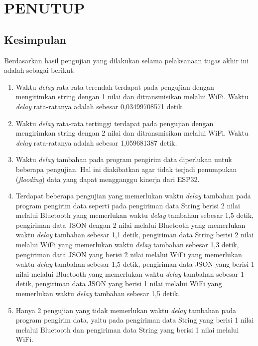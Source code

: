 \chapter{PENUTUP}
\label{chap:penutup}


\section{Kesimpulan}
\label{sec:kesimpulan}

Berdasarkan hasil pengujian yang dilakukan selama pelaksanaan tugas akhir ini adalah sebagai berikut:

\begin{enumerate}[nolistsep]

  \item Waktu \emph{delay} rata-rata terendah terdapat pada pengujian dengan mengirimkan string dengan 1 nilai dan ditransmisikan melalui WiFi. Waktu \emph{delay} rata-ratanya adalah sebesar 0,03499708571 detik.

  \item Waktu \emph{delay} rata-rata tertinggi terdapat pada pengujian dengan mengirimkan string dengan 2 nilai dan ditransmisikan melalui WiFi. Waktu \emph{delay} rata-ratanya adalah sebesar 1,059681387 detik.
  
  \item Waktu \emph{delay} tambahan pada program pengirim data diperlukan untuk beberapa pengujian. Hal ini diakibatkan agar tidak terjadi penumpukan (\emph{flooding}) data yang dapat mengganggu kinerja dari ESP32.

  \item Terdapat beberapa pengujian yang memerlukan waktu \emph{delay} tambahan pada program pengirim data seperti pada pengiriman data String berisi 2 nilai melalui Bluetooth yang memerlukan waktu \emph{delay} tambahan sebesar 1,5 detik, pengiriman data JSON dengan 2 nilai melalui Bluetooth yang memerlukan waktu \emph{delay} tambahan sebesar 1,1 detik, pengiriman data String berisi 2 nilai melalui WiFi yang memerlukan waktu \emph{delay} tambahan sebesar 1,3 detik, pengiriman data JSON yang berisi 2 nilai melalui WiFi yang memerlukan waktu \emph{delay} tambahan sebesar 1,5 detik, pengiriman data JSON yang berisi 1 nilai melalui Bluetooth yang memerlukan waktu \emph{delay} tambahan sebesar 1 detik, pengiriman data JSON yang berisi 1 nilai melalui WiFi yang memerlukan waktu \emph{delay} tambahan sebesar 1,5 detik.
  
  \item Hanya 2 pengujian yang tidak memerlukan waktu \emph{delay} tambahan pada program pengirim data, yaitu pada pengiriman data String yang berisi 1 nilai melalui Bluetooth dan pengiriman data String yang berisi 1 nilai melalui WiFi. 

\end{enumerate}

